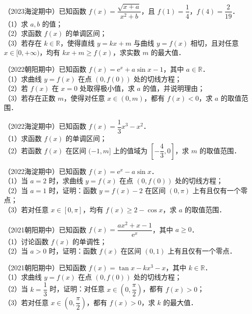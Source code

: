 \begin{example}
（2023海淀期中）已知函数 $f(x)=\dfrac{\sqrt{x+a}}{x^2+b}$，且 $f(1)=\dfrac14$，$f(4)=\dfrac{2}{19}$．\\
（1）求 $a,b$ 的值；\\
（2）求函数 $f(x)$ 的单调区间；\\
（3）若存在 $k\in\mathbb{R}$，使得直线 $y=kx+m$ 与曲线 $y=f(x)$ 相切，且对任意 $x\in[0,+\infty)$，均有 $kx+m\geqslant f(x)$，求实数 $m$ 的最大值．
\end{example}

\begin{example}
（2022朝阳期中）已知函数 $f(x)=\mathrm{e}^x+a\sin x-1$，其中 $a\in\mathbb{R}$．\\
（1）求曲线 $y=f(x)$ 在点 $(0,f(0))$ 处的切线方程；\\
（2）若 $f(x)$ 在 $x=0$ 处取得极小值，求 $a$ 的值，并说明理由；\\
（3）若存在正数 $m$，使得对任意 $x\in(0,m)$，都有 $f(x)<0$，求 $a$ 的取值范围．
\end{example}

\begin{example}
（2022海淀期中）已知函数 $f(x)=\dfrac13x^3-x^2$．\\
（1）求函数 $f(x)$ 的单调区间；\\
（2）若函数 $f(x)$ 在区间 $(-1,m]$ 上的值域为 $\left[-\dfrac43,0\right]$，求 $m$ 的取值范围．
\end{example}

\begin{example}
（2022海淀期中）已知函数 $f(x)=\mathrm{e}^x-a\sin x$．\\
（1）当 $a=2$ 时，求曲线 $y=f(x)$ 在点 $(0,f(0))$ 处的切线方程；\\
（2）当 $a=1$ 时，证明：函数 $y=f(x)-2$ 在区间 $(0,\pi)$ 上有且仅有一个零点；\\
（3）若对任意 $x\in[0,\pi]$，均有 $f(x)\geqslant 2-\cos x$，求 $a$ 的取值范围．
\end{example}

\begin{example}
（2021朝阳期中）已知函数 $f(x)=\dfrac{ax^2+x-1}{\mathrm{e}^x}$，其中 $a\geqslant 0$．\\
（1）讨论函数 $f(x)$ 的单调性；\\
（2）当 $a>0$ 时，证明：函数 $f(x)$ 在区间 $(0,1)$ 上有且仅有一个零点．
\end{example}

\begin{example}
（2021朝阳期中）已知函数 $f(x)=\tan x-kx^3-x$，其中 $k\in\mathbb{R}$．\\
（1）求曲线 $y=f(x)$ 在点 $(0,f(0))$ 处的切线方程；\\
（2）当 $k=\dfrac13$ 时，证明：对任意 $x\in\left(0,\dfrac\pi2\right)$，都有 $f(x)>0$；\\
（3）若对任意 $x\in\left(0,\dfrac\pi2\right)$，都有 $f(x)>0$，求 $k$ 的最大值．
\end{example}

